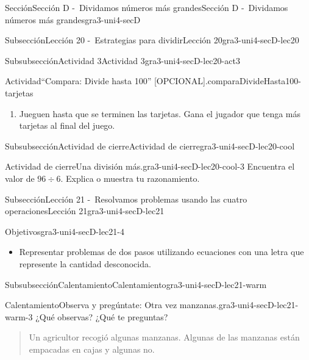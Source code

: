 \documentclass[twoside,14pt,]{extarticle}
\begin{document}
\begin{sectionptx}{Sección}{Sección D -~Dividamos números más grandes}{}{Sección D -~Dividamos números más grandes}{}{}{gra3-uni4-secD}
\begin{subsectionptx}{Subsección}{Lección 20 -~Estrategias para dividir}{}{Lección 20}{}{}{gra3-uni4-secD-lec20}
\begin{subsubsectionptx}{Subsubsección}{Actividad 3}{}{Actividad 3}{}{}{gra3-uni4-secD-lec20-act3}
\begin{activity}{Actividad}{“Compara: Divide hasta 100” [OPCIONAL].}{comparaDivideHasta100-tarjetas}
\begin{enumerate}
\item{}Jueguen hasta que se terminen las tarjetas. Gana el jugador que tenga más tarjetas al final del juego.%
\end{enumerate}
\end{activity}%
\end{subsubsectionptx}
%
%
\typeout{************************************************}
\typeout{************************************************}
%
\begin{subsubsectionptx}{Subsubsección}{Actividad de cierre}{}{Actividad de cierre}{}{}{gra3-uni4-secD-lec20-cool}
\begin{project}{Actividad de cierre}{Una división más.}{gra3-uni4-secD-lec20-cool-3}%
Encuentra el valor de \(96 \div 6\). Explica o muestra tu razonamiento.%
\end{project}%
\end{subsubsectionptx}
\end{subsectionptx}
%
%
\typeout{************************************************}
\typeout{************************************************}
%
\begin{subsectionptx}{Subsección}{Lección 21 -~Resolvamos problemas usando las cuatro operaciones}{}{Lección 21}{}{}{gra3-uni4-secD-lec21}
\begin{objectives}{Objetivos}{gra3-uni4-secD-lec21-4}
%
\begin{itemize}[label=\textbullet]
\item{}Representar problemas de dos pasos utilizando ecuaciones con una letra que represente la cantidad desconocida.%
\end{itemize}
\end{objectives}
%
%
\typeout{************************************************}
\typeout{************************************************}
%
\begin{subsubsectionptx}{Subsubsección}{Calentamiento}{}{Calentamiento}{}{}{gra3-uni4-secD-lec21-warm}
\begin{exploration}{Calentamiento}{Observa y pregúntate: Otra vez manzanas.}{gra3-uni4-secD-lec21-warm-3}%
¿Qué observas? ¿Qué te preguntas?%
\par
\begin{quote}%
Un agricultor recogió algunas manzanas. Algunas de las manzanas están empacadas en cajas y algunas no.\end{quote}
%

\end{exploration}
\end{subsubsectionptx}
\end{subsectionptx}
\end{sectionptx}
\end{document}
